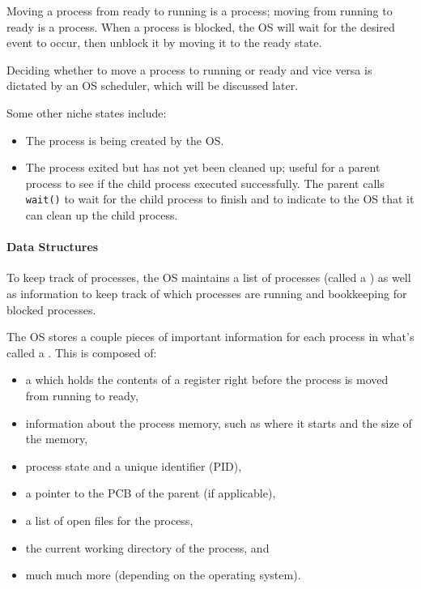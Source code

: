 Moving a process from ready to running is  a process; moving from running to ready is  a process. When a process is blocked, the OS will wait for the desired event to occur, then unblock it by moving it to the ready state.

Deciding whether to move a process to running or ready and vice versa is dictated by an OS scheduler, which will be discussed later.

Some other niche states include:
\begin{itemize}
    \item {} The process is being created by the OS.
    \item {} The process exited but has not yet been cleaned up; useful for a parent process to see if the child process executed successfully. The parent calls \texttt{wait()} to wait for the child process to finish and to indicate to the OS that it can clean up the child process.
\end{itemize}

\paragraph{Data Structures}
To keep track of processes, the OS maintains a list of processes (called a ) as well as information to keep track of which processes are running and bookkeeping for blocked processes.

The OS stores a couple pieces of important information for each process in what's called a . This is composed of:
\begin{itemize}
    \item a  which holds the contents of a register right before the process is moved from running to ready,
    \item information about the process memory, such as where it starts and the size of the memory,
    \item process state and a unique identifier (PID),
    \item a pointer to the PCB of the parent (if applicable),
    \item a list of open files for the process,
    \item the current working directory of the process, and
    \item much much more (depending on the operating system).
\end{itemize}

